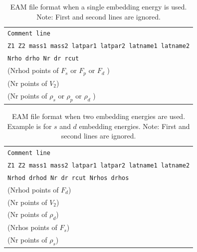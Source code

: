 \documentclass[a4paper,12pt,onecolumn]{article}
\begin{document}
\begin{table}[!h]
\caption{
EAM file format when a single embedding energy is used.
Note: First and second lines are ignored.
\label{tab:kw-eam-ff}
}
\begin{center}
\begin{tabular}{|l|}
\hline
\hline
\verb+Comment line+ \\
\verb+Z1 Z2 mass1 mass2 latpar1 latpar2 latname1 latname2+ \\
\verb+Nrho drho Nr dr rcut+ \\
(Nrhod points of $F_s$ or $F_p$ or $F_d$ ) \\
(Nr points of $V_2$)  \\
(Nr points of $\rho_s$ or $\rho_p$ or $\rho_d$ ) \\
\hline
\hline
\end{tabular}
\end{center}
\end{table}

\begin{table}[!h]
\caption{
EAM file format when two embedding energies are used.
Example is for $s$ and $d$ embedding energies.
Note: First and second lines are ignored.
\label{tab:kw-eam-ff2}
}
\begin{center}
\begin{tabular}{|l|}
\hline
\hline
\verb+Comment line+ \\
\verb+Z1 Z2 mass1 mass2 latpar1 latpar2 latname1 latname2+ \\
\verb+Nrhod drhod Nr dr rcut Nrhos drhos+ \\
(Nrhod points of $F_d$) \\
(Nr points of $V_2$)  \\
(Nr points of $\rho_d$) \\
(Nrhos points of $F_s$) \\
(Nr points of $\rho_s$) \\
\hline
\hline
\end{tabular}
\end{center}
\end{table}
\end{document}
